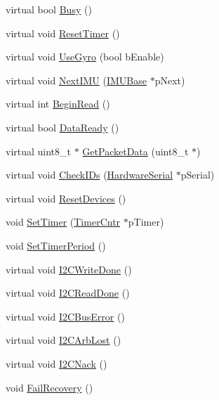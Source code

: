 \begin{DoxyCompactItemize}
\item 
virtual bool \hyperlink{class_i_m_u_ade0f7e6be2eda441bfaa2cb372fec55a}{Busy} ()
\item 
virtual void \hyperlink{class_i_m_u_a187dc9de30f97f5154e0ff904eb6ee1a}{ResetTimer} ()
\item 
virtual void \hyperlink{class_i_m_u_a86f05be645d2096f0b2b3cfbe8ea0ce8}{UseGyro} (bool bEnable)
\item 
virtual void \hyperlink{class_i_m_u_ac46c8e580371cf97e4625dda450f01fd}{NextIMU} (\hyperlink{class_i_m_u_base}{IMUBase} $\ast$pNext)
\item 
virtual int \hyperlink{class_i_m_u_a3c949edee15e2f618d7ee263b0a4bcb3}{BeginRead} ()
\item 
virtual bool \hyperlink{class_i_m_u_a078d2f3ad27475c9afcaf09c44886e4c}{DataReady} ()
\item 
virtual uint8\_\-t $\ast$ \hyperlink{class_i_m_u_a4f72b7f99fc42f30c9478ba7ed65654e}{GetPacketData} (uint8\_\-t $\ast$)
\item 
virtual void \hyperlink{class_i_m_u_a74feb2946c48a92b251e28ac256d887b}{CheckIDs} (\hyperlink{class_hardware_serial}{HardwareSerial} $\ast$pSerial)
\item 
virtual void \hyperlink{class_i_m_u_a98f9a8244dd1a07f8771450097371b2c}{ResetDevices} ()
\item 
void \hyperlink{class_i_m_u_a66680475b844fbf334a0e4e7c5fe845b}{SetTimer} (\hyperlink{class_timer_cntr}{TimerCntr} $\ast$pTimer)
\item 
void \hyperlink{class_i_m_u_a3ce9934e64dff87e18b6cc3f3700f72f}{SetTimerPeriod} ()
\item 
virtual void \hyperlink{class_i_m_u_a71568969beb6ee7d4b596f8c0a91faf9}{I2CWriteDone} ()
\item 
virtual void \hyperlink{class_i_m_u_ab4124ae29a64365787c2c03b3ab09c6c}{I2CReadDone} ()
\item 
virtual void \hyperlink{class_i_m_u_aad041ec91d266e9fc15d22de17ffccad}{I2CBusError} ()
\item 
virtual void \hyperlink{class_i_m_u_a7d4a2a761fb4956ebd9ce0b0cda69556}{I2CArbLost} ()
\item 
virtual void \hyperlink{class_i_m_u_a161f80bfcb7195196754a18eddedaf12}{I2CNack} ()
\item 
void \hyperlink{class_i_m_u_acf8e9ee1971e527c255c046d3d3c1fe9}{FailRecovery} ()
\end{DoxyCompactItemize}
